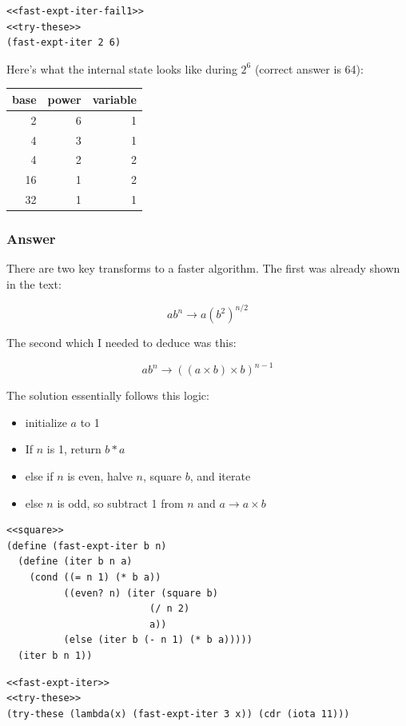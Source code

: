 \documentclass[final,fleqn,titlepage,twoside]{article}
\begin{document}
\begin{verbatim}
<<fast-expt-iter-fail1>>
<<try-these>>
(fast-expt-iter 2 6)
\end{verbatim}

Here's what the internal state looks like during \(2^6\) (correct answer is 64):
\begin{center}
\begin{tabular}{rrr}
base & power & variable\\[0pt]
\hline
2 & 6 & 1\\[0pt]
4 & 3 & 1\\[0pt]
4 & 2 & 2\\[0pt]
16 & 1 & 2\\[0pt]
32 & 1 & 1\\[0pt]
\end{tabular}
\end{center}

\subsubsection{Answer}
\label{sec:orgd2b8b49}
There are two key transforms to a faster algorithm. The first was already shown
in the text:

\[
    ab^n \to a(b^2)^{n/2}
\]

The second which I needed to deduce was this:

\[
    ab^n \to ((a \times b) \times b)^{n - 1}
\]

The solution essentially follows this logic:
\begin{itemize}
\item initialize \(a\) to 1
\item If \(n\) is 1, return \(b * a\)
\item else if \(n\) is even, halve \(n\), square \(b\), and iterate
\item else \(n\) is odd, so subtract 1 from \(n\) and \(a \to a \times b\)
\end{itemize}

\begin{verbatim}
<<square>>
(define (fast-expt-iter b n)
  (define (iter b n a)
    (cond ((= n 1) (* b a))
          ((even? n) (iter (square b)
                         (/ n 2)
                         a))
          (else (iter b (- n 1) (* b a)))))
  (iter b n 1))
\end{verbatim}

\begin{verbatim}
<<fast-expt-iter>>
<<try-these>>
(try-these (lambda(x) (fast-expt-iter 3 x)) (cdr (iota 11)))
\end{verbatim}
\end{document}
